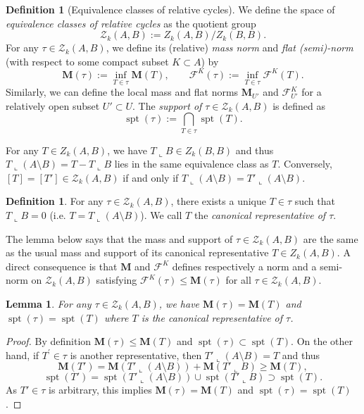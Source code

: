 \documentclass[10pt]{amsart}
\newtheorem{lemma}[theorem]{Lemma}
\theoremstyle{definition}
\newtheorem{definition}[theorem]{Definition}
\theoremstyle{remark}
\numberwithin{equation}{section}
\newcommand{\F}{\mathcal{F}}
\newcommand{\lc}{\llcorner}
\newcommand{\pr}{\prime}
\newcommand{\Z}{\mathcal{Z}}
\newcommand{\M}{\mathbf{M}}
\newcommand{\spt}{\operatorname{spt}}
\begin{document}
\begin{definition}[Equivalence classes of relative cycles]
\label{D:relative-cycles}
We define the space of \emph{equivalence classes of relative cycles} as the quotient group
\[ \Z_k(A, B):=Z_k(A, B)/Z_k(B, B).\]
For any $\tau\in\Z_k(A, B)$, we define its (relative) {\em mass norm} and \emph{flat (semi)-norm} (with respect to some compact subset $K \subset A$) by
\[ \M(\tau):=\inf_{T \in \tau} \M(T), \qquad \F^K(\tau):=\inf_{T \in \tau} \F^K(T).\]
Similarly, we can define the local mass and flat norms $\M_{U'}$ and $\F^K_{U'}$ for a relatively open subset $U' \subset U$. The \emph{support of $\tau \in \Z_k(A,B)$} is defined as
\[ \spt(\tau):=\bigcap_{T \in \tau} \spt(T).\]
\end{definition}

For any $T \in Z_k(A,B)$, we have $T\lc B \in Z_k(B,B)$ and thus $T \lc (A \setminus B)=T - T \lc B$ lies in the same equivalence class as $T$. Conversely, $[T]=[T'] \in \Z_k(A,B)$ if and only if $T \lc (A \setminus B)=T' \lc (A \setminus B)$.

\begin{definition}
For any $\tau \in \Z_k(A,B)$, there exists a unique $T \in \tau$ such that $T \lc B=0$ (i.e. $T=T \lc (A \setminus B)$). We call $T$ the \emph{canonical representative of $\tau$}.
\end{definition}

The lemma below says that the mass and support of $\tau \in \Z_k(A,B)$ are the same as the usual mass and support of its canonical representative $T \in Z_k(A,B)$. A direct consequence is that $\M$ and $\F^K$ defines respectively a norm and a semi-norm on $\Z_k(A,B)$ satisfying $\F^K(\tau)\leq \M(\tau)$ for all $\tau \in \Z_k(A,B)$.

\begin{lemma}
\label{L:can-rep}
For any $\tau \in\Z_k(A, B)$, we have $\M(\tau)=\M(T)$ and $\spt(\tau)=\spt(T)$ where $T$ is the canonical representative of $\tau$.
\end{lemma}
\begin{proof}
By definition $\M(\tau)\leq \M(T)$ and $\spt(\tau)\subset \spt(T)$. On the other hand, if $T^{\pr} \in \tau$ is another representative, then $T' \lc (A \setminus B)=T$ and thus
\[ \M(T')=\M(T'\lc (A \setminus B))+\M(T'\lc B) \geq \M(T),\]
\[ \spt(T')=\spt(T'\lc (A \setminus B))\cup \spt(T'\lc B) \supset \spt(T ).\]
As $T' \in \tau$ is arbitrary, this implies $\M(\tau)=\M(T)$ and $\spt(\tau)=\spt(T)$.
\end{proof}
\end{document}
